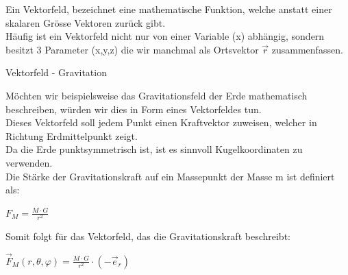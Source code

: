 \beginip
Ein Vektorfeld, bezeichnet eine mathematische Funktion, welche anstatt einer skalaren Grösse Vektoren zurück gibt. \\
Häufig ist ein Vektorfeld nicht nur von einer Variable (x) abhängig, sondern besitzt 3 Parameter (x,y,z) die wir manchmal als Ortsvektor $\vec{r}$ zusammenfassen.  \\
\iend

 {Vektorfeld - Gravitation}

\beginbsp
Möchten wir beispielsweise das Gravitationsfeld der Erde mathematisch beschreiben, würden wir dies in Form eines Vektorfeldes tun. \\
Dieses Vektorfeld soll jedem Punkt einen Kraftvektor zuweisen, welcher in Richtung Erdmittelpunkt zeigt. \\
Da die Erde punktsymmetrisch ist, ist es sinnvoll Kugelkoordinaten zu verwenden. \\
Die Stärke der Gravitationskraft auf ein Massepunkt der Masse m ist definiert als:
\begin{center}
	$F_M = \frac{M \cdot G}{r^2}$
\end{center}

Somit folgt für das Vektorfeld, das die Gravitationskraft beschreibt:
\begin{center}
	$\displaystyle \vec{F}_M (r,\theta,\varphi) = \frac{M \cdot G}{r^2} \cdot (- \vec{e}_r)$
\end{center}

\begin{center}

\end{center}
\iend

